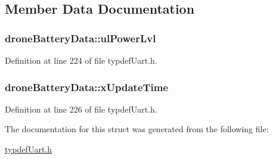 \subsection{Member Data Documentation}
\hypertarget{structdroneBatteryData_a789c02e04e8c2e46989309ff33c44b1d}{
\subsubsection[{ul\-Power\-Lvl}]{ drone\-Battery\-Data\-::ul\-Power\-Lvl}}\label{structdroneBatteryData_a789c02e04e8c2e46989309ff33c44b1d}


Definition at line 224 of file typdef\-Uart.\-h.

\hypertarget{structdroneBatteryData_a52ebc5b82ebb0220cff03229eb9c660f}{
\subsubsection[{x\-Update\-Time}]{ drone\-Battery\-Data\-::x\-Update\-Time}}\label{structdroneBatteryData_a52ebc5b82ebb0220cff03229eb9c660f}


Definition at line 226 of file typdef\-Uart.\-h.



The documentation for this struct was generated from the following file\-:\begin{DoxyCompactItemize}
\item 
\hyperlink{typdefUart_8h}{typdef\-Uart.\-h}\end{DoxyCompactItemize}
